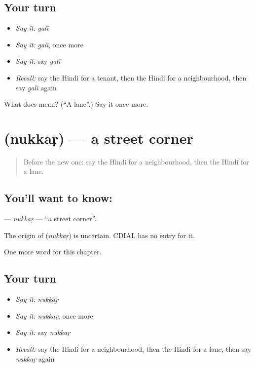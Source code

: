 \subsection*{Your turn}
\begin{itemize}
\raggedright
  \item \emph{Say it:} \emph{galī}
  \item \emph{Say it:} \emph{galī}, once more
  \item \emph{Say it:} say \emph{galī}
  \item \emph{Recall:} say the Hindi for a tenant, then the Hindi for a neighbourhood, then say \emph{galī} again
\end{itemize}

\begin{tcolorbox}[breakable,colback=teal!4,colframe=teal!35!black,title={Before you move on}]
What does  mean? (\textquotedblleft{}A lane\textquotedblright{}.) Say it once more.
\end{tcolorbox}
\section[\texorpdfstring{\hi{नुक्कड़} (nukkaṛ)}{नुक्कड़ (nukkaṛ)}]{ (nukkaṛ) — a street corner}

\label{lesson:HI-C272-nukkar}



\begin{quote}
Before the new one: say the Hindi for a neighbourhood, then the Hindi for a lane.
\end{quote}

\subsection*{You'll want to know: }
\textbf{} — \emph{nukkaṛ} — \textquotedblleft{}a street corner\textquotedblright{}.

\begin{cousinweb}
The origin of \textbf{} (\emph{nukkaṛ}) is uncertain. CDIAL has no entry for it.
\end{cousinweb}

\begin{grammarlens}[title={What you've built}]
One more word for this chapter.
\end{grammarlens}

\subsection*{Your turn}
\begin{itemize}
\raggedright
  \item \emph{Say it:} \emph{nukkaṛ}
  \item \emph{Say it:} \emph{nukkaṛ}, once more
  \item \emph{Say it:} say \emph{nukkaṛ}
  \item \emph{Recall:} say the Hindi for a neighbourhood, then the Hindi for a lane, then say \emph{nukkaṛ} again
\end{itemize}

